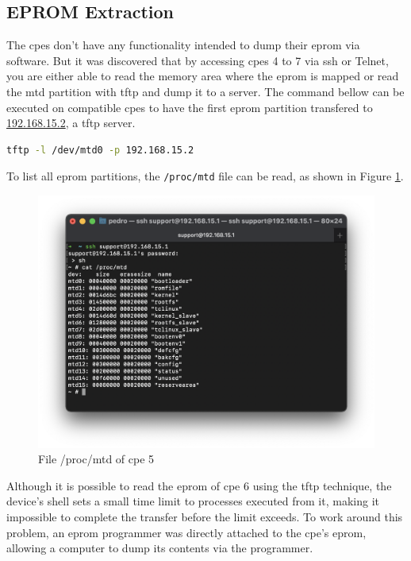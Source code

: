 \subsection{EPROM Extraction}

The \glspl{cpe} don’t have any functionality intended to dump their \gls{eprom} via software. But it was discovered that by accessing \glspl{cpe} 4 to 7 via \gls{ssh} or Telnet, you are either able to read the memory area where the \gls{eprom} is mapped or read the \gls{mtd} partition with \gls{tftp} and dump it to a server. The command bellow can be executed on compatible \glspl{cpe} to have the first \gls{eprom} partition transfered to \url{192.168.15.2}, a \gls{tftp} server.

\begin{lstlisting}[language=Bash,numbers=none]
tftp -l /dev/mtd0 -p 192.168.15.2
\end{lstlisting}

To list all \gls{eprom} partitions, the \texttt{/proc/mtd} file can be read, as shown in Figure \ref{figure:cpe5_proc_mtd}.

\begin{figure}[h]
    \centering
    \includegraphics[width=\linewidth]{contents/cpes-and-research-data/eprom-extraction/cpe5-proc-mtd.png}
    \caption{File /proc/mtd of \gls{cpe} 5}
    \label{figure:cpe5_proc_mtd}
\end{figure}

Although it is possible to read the \gls{eprom} of \gls{cpe} 6 using the \gls{tftp} technique, the device’s shell sets a small time limit to processes executed from it, making it impossible to complete the transfer before the limit exceeds. To work around this problem, an \gls{eprom} programmer was directly attached to the \gls{cpe}’s \gls{eprom}, allowing a computer to dump its contents via the programmer.

